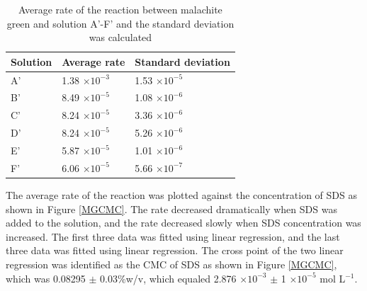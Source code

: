 \documentclass[twocolumn]{article} %
\begin{document}
\begin{table}[h]
    \caption{Average rate of the reaction between malachite green and solution A'-F' and the standard deviation was calculated}
    \label{NaOHSDS average}
    \begin{tabular}{L{0.4in}C{1.3in}C{1.3in}}\toprule
        Solution & Average  rate & Standard deviation \\\midrule
        A' & 1.38 $\times 10^{-3}$ & 1.53 $\times 10^{-5}$   \\
        B' & 8.49 $\times 10^{-5}$ & 1.08 $\times 10^{-6}$   \\
        C' & 8.24 $\times 10^{-5}$ & 3.36 $\times 10^{-6}$ \\
        D' & 8.24 $\times 10^{-5}$ & 5.26 $\times 10^{-6}$ \\
        E' & 5.87 $\times 10^{-5}$ & 1.01 $\times 10^{-6}$ \\
        F' & 6.06 $\times 10^{-5}$ & 5.66 $\times 10^{-7}$ \\\bottomrule
    \end{tabular}
\end{table}






The average rate of the reaction was plotted against the concentration of SDS as shown in Figure \ref{MGCMC}. The rate decreased dramatically when SDS was added to the solution, and the rate decreased slowly when SDS concentration was increased. The first three data was fitted using linear regression, and the last three data was fitted using linear regression. The cross point of the two linear regression was identified as the CMC of SDS as shown in Figure \ref{MGCMC}, which was 0.08295 $\pm$ 0.03\%w/v, which equaled 2.876 $\times 10^{-3}$ $\pm$ 1 $\times 10^{-5}$ mol L$^{-1}$.
\end{document}
